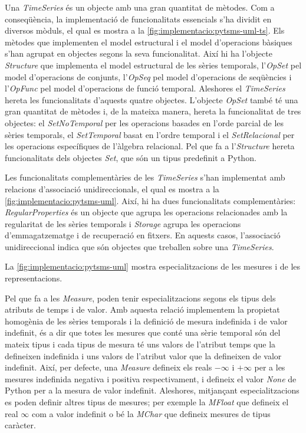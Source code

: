 Una \emph{TimeSeries} és un objecte amb una gran quantitat de
mètodes. Com a conseqüència, la implementació de funcionalitats
essencials s'ha dividit en diversos mòduls, el qual es mostra a la
\autoref{fig:implementacio:pytsms-uml-ts}. Els mètodes que implementen
el model estructural i el model d'operacions bàsiques s'han agrupat en
objectes segons la seva funcionalitat. Així hi ha l'objecte
\emph{Structure} que implementa el model estructural de les sèries
temporals, l'\emph{OpSet} pel model d'operacions de conjunts,
l'\emph{OpSeq} pel model d'operacions de seqüències i l'\emph{OpFunc}
pel model d'operacions de funció temporal.  Aleshores el
\emph{TimeSeries} hereta les funcionalitats d'aquests quatre objectes.
L'objecte \emph{OpSet} també té una gran quantitat de mètodes i, de la
mateixa manera, hereta la funcionalitat de tres objectes: el
\emph{SetNoTemporal} per les operacions basades en l'orde parcial de
les sèries temporals, el \emph{SetTemporal} basat en l'ordre temporal
i el \emph{SetRelacional} per les operacions específiques de l'àlgebra
relacional. Pel que fa a l'\emph{Structure} hereta funcionalitats dels
objectes \emph{Set}, que són un tipus predefinit a Python.


Les funcionalitats complementàries de les \emph{TimeSeries} s'han
implementat amb relacions d'associació unidireccionals, el qual es
mostra a la \autoref{fig:implementacio:pytsms-uml}. Així, hi ha dues
funcionalitats complementàries: \emph{RegularProperties} és un objecte
que agrupa les operacions relacionades amb la regularitat de les
sèries temporals i \emph{Storage} agrupa les operacions
d'emmagatzematge i de recuperació en fitxers. En aquests casos,
l'associació unidireccional indica que són objectes que treballen
sobre una \emph{TimeSeries}.





La \autoref{fig:implementacio:pytsms-uml} mostra
especialitzacions de les mesures i de les representacions.

Pel que fa a les \emph{Measure}, poden tenir especialitzacions segons
els tipus dels atributs de temps i de valor. Amb aquesta relació
implementem la propietat homogènia de les sèries temporals i la
definició de mesura indefinida i de valor indefinit, és a dir que
totes les mesures que conté una sèrie temporal són del mateix tipus i
cada tipus de mesura té uns valors de l'atribut temps que la
defineixen indefinida i uns valors de l'atribut valor que la
defineixen de valor indefinit.  Així, per defecte, una \emph{Measure}
defineix els reals $-\infty$ i $+\infty$ per a les mesures indefinida
negativa i positiva respectivament, i defineix el valor \emph{None} de
Python per a la mesura de valor indefinit. Aleshores, mitjançant
especialitzacions es poden definir altres tipus de mesures; per
exemple la \emph{MFloat} que defineix el real $\infty$ com a valor
indefinit o bé la \emph{MChar} que defineix mesures de tipus caràcter.





